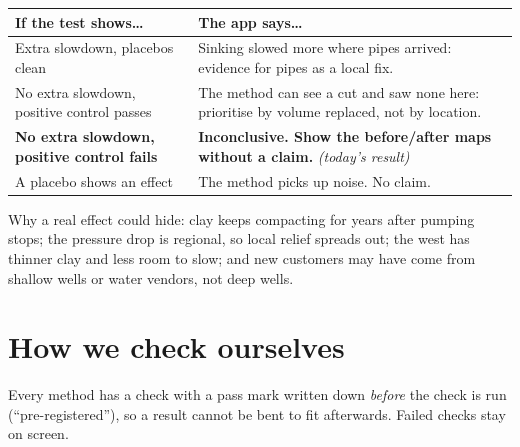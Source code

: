 \documentclass[11pt,a4paper]{article}
\begin{document}
\begin{center}
\small
\begin{tabularx}{\linewidth}{@{}L{60mm}Y@{}}
\toprule
\textbf{If the test shows\ldots} & \textbf{The app says\ldots}\\
\midrule
Extra slowdown, placebos clean & Sinking slowed more where pipes arrived: evidence for pipes as a local fix.\\
No extra slowdown, positive control passes & The method can see a cut and saw none here: prioritise by
  volume replaced, not by location.\\
\textbf{No extra slowdown, positive control fails} & \textbf{Inconclusive. Show the before/after maps
  without a claim.} \emph{(today's result)}\\
A placebo shows an effect & The method picks up noise. No claim.\\
\bottomrule
\end{tabularx}
\end{center}

Why a real effect could hide: clay keeps compacting for years after pumping stops; the pressure drop is
regional, so local relief spreads out; the west has thinner clay and less room to slow; and new customers
may have come from shallow wells or water vendors, not deep wells.

\section{How we check ourselves}\label{sec:checks}

\begin{inshort}
Every method has a check with a pass mark written down \emph{before} the check is run (``pre-registered''),
so a result cannot be bent to fit afterwards. Failed checks stay on screen.
\end{inshort}
\end{document}
